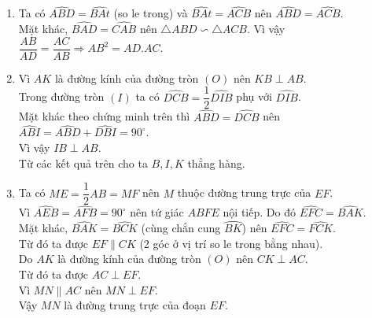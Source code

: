 \begin{ex}
{\begin{enumerate}
\item Ta có $\widehat{ABD}=\widehat{BAt}$ (so le trong) và $\widehat{BAt}=\widehat{ACB}$ nên $\widehat{ABD}=\widehat{ACB}$.\\Mặt khác, $\widehat{BAD}=\widehat{CAB}$ nên $\triangle ABD\backsim \triangle ACB$. Vì vậy $\dfrac{AB}{AD}=\dfrac{AC}{AB}\Rightarrow AB^2=AD.AC$.
\item Vì $AK$ là đường kính của đường tròn $(O)$ nên $KB\perp AB$.\\Trong đường tròn $(I)$ ta có $\widehat{DCB}=\dfrac{1}{2}\widehat{DIB}$ phụ với $\widehat{DIB}$.\\Mặt khác theo chứng minh trên thì $\widehat{ABD}=\widehat{DCB}$ nên $\widehat{ABI}=\widehat{ABD}+\widehat{DBI}=90^\circ$.\\Vì vậy $IB\perp AB$.\\Từ các kết quả trên cho ta $B, I, K$ thẳng hàng.
\item Ta có $ME=\dfrac{1}{2}AB=MF$ nên $M$ thuộc đường trung trực của $EF$.\\Vì $\widehat{AEB}=\widehat{AFB}=90^\circ$ nên tứ giác $ABFE$ nội tiếp. Do đó $\widehat{EFC}=\widehat{BAK}$.\\Mặt khác, $\widehat{BAK}=\widehat{BCK}$ (cùng chắn cung $\wideparen{BK}$) nên $\widehat{EFC}=\widehat{FCK}$.\\Từ đó ta được $EF\parallel CK$ (2 góc ở vị trí so le trong bằng nhau).\\Do $AK$ là đường kính của đường tròn $(O)$ nên $CK\perp AC$.\\Từ đó ta được $AC\perp EF$.\\Vì $MN\parallel AC$ nên $MN\perp EF$.\\Vậy $MN$ là đường trung trực của đoạn $EF$.
\end{enumerate}
    }
\end{ex}

